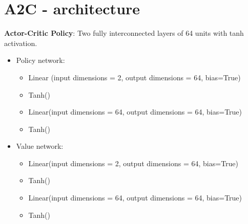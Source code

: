 \documentclass[a4paper, 12pt]{article}
\newcommand{\rowspace}[1]{\renewcommand{\arraystretch}{#1}}
\begin{document}
\section{A2C - architecture}
\textbf{Actor-Critic Policy}: Two fully interconnected layers of 64 units with tanh activation.
\begin{itemize}
	\item Policy network:
	\begin{itemize}
		\item Linear (input dimensions = 2, output dimensions = 64, bias=True)
		\item Tanh()
		\item Linear(input dimensions = 64, output dimensions = 64, bias=True)
		\item Tanh()
	\end{itemize}

	\item Value network:
	\begin{itemize}
		\item Linear(input dimensions = 2, output dimensions = 64, bias=True)
		\item Tanh()
		\item Linear(input dimensions = 64, output dimensions = 64, bias=True)
		\item Tanh()
	\end{itemize}
\end{itemize}


%		
\newpage
\end{document}
